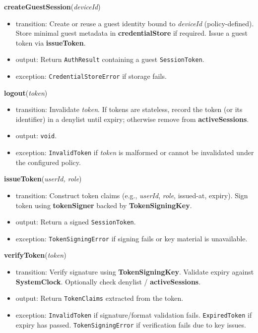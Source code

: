 \documentclass[12pt, titlepage]{article}
\begin{document}
\noindent\textbf{createGuestSession}(\textit{deviceId})
\begin{itemize}
    \item transition: Create or reuse a guest identity bound to \textit{deviceId} (policy-defined). Store minimal guest metadata in \textbf{credentialStore} if required. Issue a guest token via \textbf{issueToken}.
    \item output: Return \texttt{AuthResult} containing a guest \texttt{SessionToken}.
    \item exception: \texttt{CredentialStoreError} if storage fails.
\end{itemize}

\noindent\textbf{logout}(\textit{token})
\begin{itemize}
    \item transition: Invalidate \textit{token}. If tokens are stateless, record the token (or its identifier) in a denylist until expiry; otherwise remove from \textbf{activeSessions}.
    \item output: \texttt{void}.
    \item exception: \texttt{InvalidToken} if \textit{token} is malformed or cannot be invalidated under the configured policy.
\end{itemize}

\noindent\textbf{issueToken}(\textit{userId, role})
\begin{itemize}
    \item transition: Construct token claims (e.g., \textit{userId}, \textit{role}, issued-at, expiry). Sign token using \textbf{tokenSigner} backed by \textbf{TokenSigningKey}.
    \item output: Return a signed \texttt{SessionToken}.
    \item exception: \texttt{TokenSigningError} if signing fails or key material is unavailable.
\end{itemize}

\noindent\textbf{verifyToken}(\textit{token})
\begin{itemize}
    \item transition: Verify signature using \textbf{TokenSigningKey}. Validate expiry against \textbf{SystemClock}. Optionally check denylist / \textbf{activeSessions}.
    \item output: Return \texttt{TokenClaims} extracted from the token.
    \item exception: \texttt{InvalidToken} if signature/format validation fails. \texttt{ExpiredToken} if expiry has passed. \texttt{TokenSigningError} if verification fails due to key issues.
\end{itemize}
\end{document}
